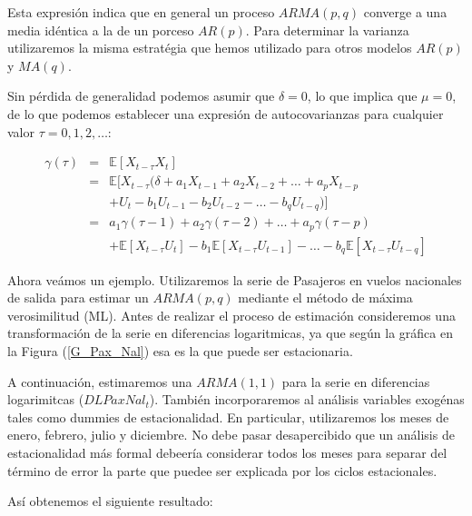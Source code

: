 \documentclass[
  a4paper,
]{article}
\begin{document}
Esta expresión indica que en general un proceso \(ARMA(p, q)\) converge
a una media idéntica a la de un porceso \(AR(p)\). Para determinar la
varianza utilizaremos la misma estratégia que hemos utilizado para otros
modelos \(AR(p)\) y \(MA(q)\).

Sin pérdida de generalidad podemos asumir que \(\delta = 0\), lo que
implica que \(\mu = 0\), de lo que podemos establecer una expresión de
autocovarianzas para cualquier valor \(\tau = 0, 1, 2, \ldots\):

\begin{eqnarray}
    \gamma(\tau) & = & \mathbb{E}[X_{t-\tau} X_t] \nonumber \\
    & = & \mathbb{E}[X_{t-\tau} (\delta + a_1 X_{t - 1} + a_2 X_{t - 2} + \ldots + a_p X_{t - p} \nonumber \\
    &   & + U_t - b_1 U_{t - 1} - b_2  U_{t - 2} - \ldots - b_q  U_{t - q})] \nonumber \\
    & = & a_1 \gamma(\tau - 1) + a_2 \gamma(\tau - 2) + \ldots + a_p \gamma(\tau - p) \nonumber \\
    &   & + \mathbb{E}[X_{t-\tau} U_{t}] - b_1  \mathbb{E}[X_{t-\tau} U_{t-1}] - \ldots  - b_q  \mathbb{E}[X_{t-\tau} U_{t-q}] 
\end{eqnarray}

Ahora veámos un ejemplo. Utilizaremos la serie de Pasajeros en vuelos
nacionales de salida para estimar un \(ARMA(p, q)\) mediante el método
de máxima verosimilitud (ML). Antes de realizar el proceso de estimación
consideremos una transformación de la serie en diferencias logaritmicas,
ya que según la gráfica en la Figura (\ref{G_Pax_Nal}) esa es la que
puede ser estacionaria.

A continuación, estimaremos una \(ARMA(1, 1)\) para la serie en
diferencias logarimitcas (\(DLPaxNal_t\)). También incorporaremos al
análisis variables exogénas tales como dummies de estacionalidad. En
particular, utilizaremos los meses de enero, febrero, julio y diciembre.
No debe pasar desapercibido que un análisis de estacionalidad más formal
debeería considerar todos los meses para separar del término de error la
parte que puedee ser explicada por los ciclos estacionales.

Así obtenemos el siguiente resultado:
\end{document}
